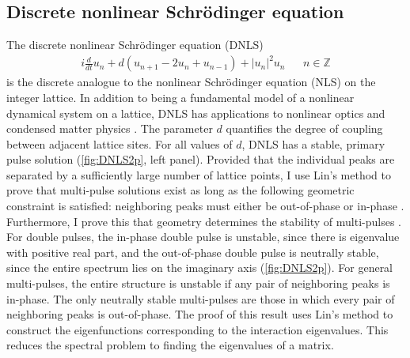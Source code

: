 \documentclass[12pt,reqno,oneside,hidelinks]{article}
\begin{document}
\subsection*{Discrete nonlinear Schr\"odinger equation}

The discrete nonlinear Schr{\"o}dinger equation (DNLS) 
\begin{align*}
    i \frac{d}{dt} u_n + d(u_{n+1} - 2 u_n + u_{n-1}) + |u_n|^2 u_n && n \in \mathbb{Z}
\end{align*}
is the discrete analogue to the nonlinear Schr{\"o}dinger equation (NLS) on the integer lattice. In addition to being a fundamental model of a nonlinear dynamical system on a lattice, DNLS has applications to nonlinear optics and condensed matter physics \cite{Kevrekidis2009}. The parameter $d$ quantifies the degree of coupling between adjacent lattice sites.  For all values of $d$, DNLS has a stable, primary pulse solution (\cref{fig:DNLS2p}, left panel). Provided that the individual peaks are separated by a sufficiently large number of lattice points, I use Lin's method to prove that multi-pulse solutions exist as long as the following geometric constraint is satisfied: neighboring peaks must either be out-of-phase or in-phase \cite[Theorem 4]{Parker2020}. Furthermore, I prove this that geometry determines the stability of multi-pulses \cite[Theorem 5]{Parker2020}. For double pulses, the in-phase double pulse is unstable, since there is eigenvalue with positive real part, and the out-of-phase double pulse is neutrally stable, since the entire spectrum lies on the imaginary axis (\cref{fig:DNLS2p}). For general multi-pulses, the entire structure is unstable if any pair of neighboring peaks is in-phase. The only neutrally stable multi-pulses are those in which every pair of neighboring peaks is out-of-phase. The proof of this result uses Lin's method to construct the eigenfunctions corresponding to the interaction eigenvalues. This reduces the spectral problem to finding the eigenvalues of a matrix.
\end{document}
